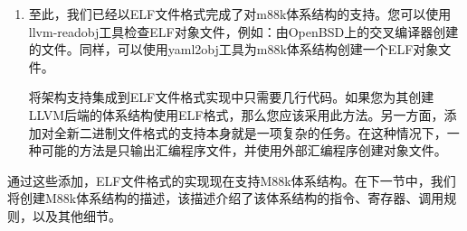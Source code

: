 \begin{enumerate}
\item 至此，我们已经以ELF文件格式完成了对m88k体系结构的支持。您可以使用llvm-readobj工具检查ELF对象文件，例如：由OpenBSD上的交叉编译器创建的文件。同样，可以使用yaml2obj工具为m88k体系结构创建一个ELF对象文件。

\begin{tcolorbox}[colback=blue!5!white,colframe=blue!75!black, title=是否必须添加对对象文件格式的支持?]
	
将架构支持集成到ELF文件格式实现中只需要几行代码。如果您为其创建LLVM后端的体系结构使用ELF格式，那么您应该采用此方法。另一方面，添加对全新二进制文件格式的支持本身就是一项复杂的任务。在这种情况下，一种可能的方法是只输出汇编程序文件，并使用外部汇编程序创建对象文件。
\end{tcolorbox}

\end{enumerate}

通过这些添加，ELF文件格式的实现现在支持M88k体系结构。在下一节中，我们将创建M88k体系结构的描述，该描述介绍了该体系结构的指令、寄存器、调用规则，以及其他细节。\par























































